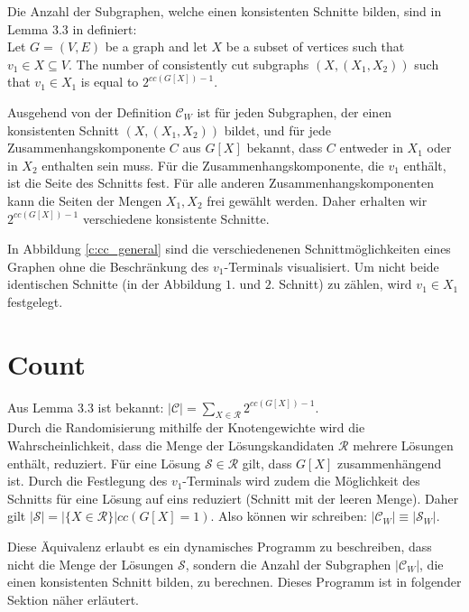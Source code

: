 Die Anzahl der Subgraphen, welche einen konsistenten Schnitte bilden, sind in Lemma 3.3 in \cite{cygan_solving_2011} definiert:\\
Let $G=(V,E)$ be a graph and let $X$ be a subset of vertices such that $v_1 \in X \subseteq V$. The number of consistently cut subgraphs $(X,(X_1,X_2))$ such that $v_1 \in X_1$ is equal to $2^{cc(G[X])-1}$.

Ausgehend von der Definition $\mathcal{C}_W$ ist für jeden Subgraphen, der einen konsistenten Schnitt $(X,(X_1,X_2))$ bildet, und für jede Zusammenhangskomponente $C$ aus $G[X]$ bekannt, dass  $C$ entweder in $X_1$ oder in $X_2$ enthalten sein muss. Für die Zusammenhangskomponente, die $v_1$ enthält, ist die Seite des Schnitts fest. Für alle anderen Zusammenhangskomponenten kann die Seiten der Mengen $X_1,X_2$ frei gewählt werden. Daher erhalten wir $2^{cc(G[X])-1}$ verschiedene konsistente Schnitte.

In Abbildung \ref{c:cc_general} sind die verschiedenenen Schnittmöglichkeiten eines Graphen ohne die Beschränkung des $v_1$-Terminals visualisiert. Um nicht beide identischen Schnitte (in der Abbildung $1.$ und $2.$ Schnitt) zu zählen, wird $v_1 \in X_1$ festgelegt. 

\section{Count}
\label{sec:st_count}
Aus Lemma 3.3 ist bekannt: $|\mathcal{C}|=\sum_{X \in \mathcal{R}} 2^{cc(G[X])-1}$. \\
Durch die Randomisierung mithilfe der Knotengewichte wird die Wahrscheinlichkeit, dass die Menge der Lösungskandidaten $\mathcal{R}$ mehrere Lösungen enthält, reduziert. 
Für eine Lösung $\mathcal{S} \in \mathcal{R}$ gilt, dass $G[X]$ zusammenhängend ist. 
Durch die Festlegung des $v_1$-Terminals wird zudem die Möglichkeit des Schnitts für eine Lösung auf eins reduziert (Schnitt mit der leeren Menge). 
Daher gilt $|\mathcal{S}| = |\{X \in \mathcal{R}\}| cc(G[X]=1)$.
Also können wir schreiben: $|\mathcal{C}_W| \equiv |\mathcal{S}_W|$.

Diese Äquivalenz erlaubt es ein dynamisches Programm zu beschreiben, dass nicht die Menge der Lösungen $\mathcal{S}$, sondern die Anzahl der Subgraphen $|\mathcal{C}_W|$, die einen konsistenten Schnitt bilden, zu berechnen. Dieses Programm ist in folgender Sektion näher erläutert.

